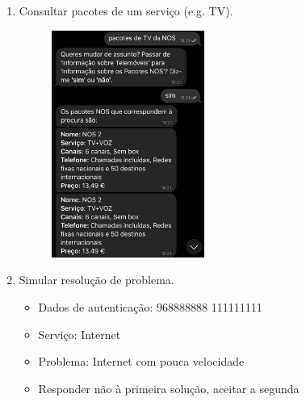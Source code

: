 \documentclass[11pt, a4paper]{article}
\begin{document}
\begin{appendices}
\begin{enumerate}
\begin{figure}[H]
        \qquad
    \end{figure}
    \item Consultar pacotes de um serviço (e.g. TV).
    \begin{figure}[H]
        \centering
        \includegraphics[width=5cm]{images/guiaoR/14.jpg}
    \end{figure}
    \item Simular resolução de problema.
    \begin{itemize}
        \item Dados de autenticação: 968888888 111111111
        \item Serviço: Internet
        \item Problema: Internet com pouca velocidade
        \item Responder não à primeira solução, aceitar a segunda
    \end{itemize}
    \begin{figure}[H]
        \centering

\end{figure}
\end{enumerate}
\end{appendices}
\end{document}
